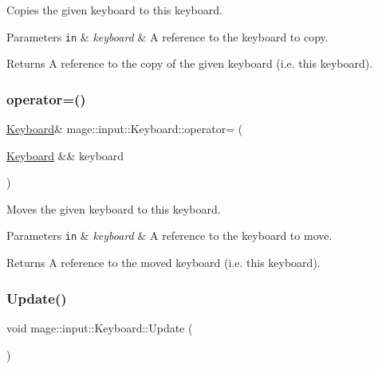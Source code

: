 Copies the given keyboard to this keyboard.


\begin{DoxyParams}[1]{Parameters}
\mbox{\tt in}  & {\em keyboard} & A reference to the keyboard to copy. \\
\hline
\end{DoxyParams}
\begin{DoxyReturn}{Returns}
A reference to the copy of the given keyboard (i.\+e. this keyboard). 
\end{DoxyReturn}
\mbox{\label{classmage_1_1input_1_1_keyboard_a7dc2316d53a043fa42e4909bd8e58bb9}} 
\subsubsection{\texorpdfstring{operator=()}{operator=()}\hspace{0.1cm}{\footnotesize\ttfamily [2/2]}}
{\footnotesize\ttfamily \mbox{\hyperlink{classmage_1_1input_1_1_keyboard}{Keyboard}}\& mage\+::input\+::\+Keyboard\+::operator= (\begin{DoxyParamCaption}\item[{\mbox{\hyperlink{classmage_1_1input_1_1_keyboard}{Keyboard}} \&\&}]{keyboard }\end{DoxyParamCaption})\hspace{0.3cm}{\ttfamily [delete]}}

Moves the given keyboard to this keyboard.


\begin{DoxyParams}[1]{Parameters}
\mbox{\tt in}  & {\em keyboard} & A reference to the keyboard to move. \\
\hline
\end{DoxyParams}
\begin{DoxyReturn}{Returns}
A reference to the moved keyboard (i.\+e. this keyboard). 
\end{DoxyReturn}
\mbox{\label{classmage_1_1input_1_1_keyboard_a14e53eed6b75a2c45ca3caf94d797bc0}} 
\subsubsection{\texorpdfstring{Update()}{Update()}}
{\footnotesize\ttfamily void mage\+::input\+::\+Keyboard\+::\+Update (\begin{DoxyParamCaption}{ }\end{DoxyParamCaption})\hspace{0.3cm}{\ttfamily [noexcept]}}

